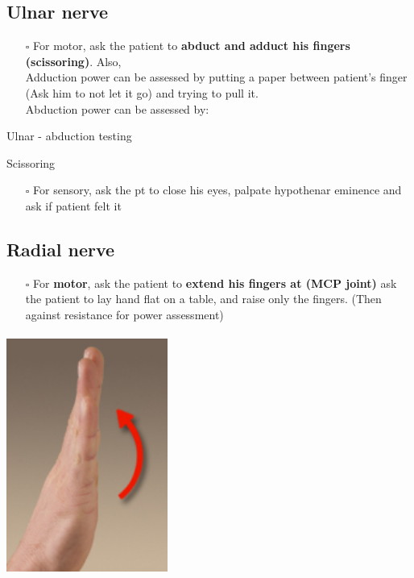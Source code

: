 \documentclass[
  13.5pt,
  a4paper,
  DIV=11,
  numbers=noendperiod]{scrreprt}
\providecommand{\tightlist}{%
  \setlength{\itemsep}{0pt}\setlength{\parskip}{0pt}}
\begin{document}
\subsection{Ulnar nerve}\label{ulnar-nerve}

\begin{itemize}
\tightlist
\item[$\square$]
  For motor, ask the patient to \textbf{abduct and adduct his fingers
  (scissoring)}. Also,\\
  Adduction power can be assessed by putting a paper between patient's
  finger (Ask him to not let it go) and trying to pull it.\\
  Abduction power can be assessed by:
\end{itemize}

Ulnar - abduction testing

Scissoring

\begin{itemize}
\tightlist
\item[$\square$]
  For sensory, ask the pt to close his eyes, palpate hypothenar eminence
  and ask if patient felt it
\end{itemize}

\subsection{Radial nerve}\label{radial-nerve}

\begin{itemize}
\tightlist
\item[$\square$]
  For \textbf{motor}, ask the patient to \textbf{extend his fingers at
  (MCP joint)} ask the patient to lay hand flat on a table, and raise
  only the fingers. (Then against resistance for power assessment)
\end{itemize}

\includegraphics[width=2.08333in,height=3.125in]{mss4.png}
\end{document}
